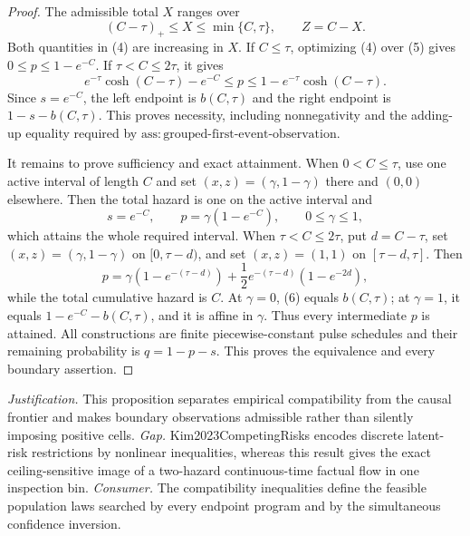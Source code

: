 \documentclass{article}
\begin{document}
\begin{proof}
The admissible total \(X\) ranges over
\[
 (C-\tau)_+\le X\le\min\{C,\tau\},\quad\quad Z=C-X.           \tag{5}
\]
Both quantities in (4) are increasing in \(X\).  If \(C\le\tau\), optimizing (4) over (5) gives \(0\le p\le1-e^{-C}\).  If \(\tau<C\le2\tau\), it gives
\[
 e^{-\tau}\cosh(C-\tau)-e^{-C}
 \le p\le
 1-e^{-\tau}\cosh(C-\tau).
\]
Since \(s=e^{-C}\), the left endpoint is \(b(C,\tau)\) and the right endpoint is \(1-s-b(C,\tau)\).  This proves necessity, including nonnegativity and the adding-up equality required by \(\mathrm{ass{:}grouped\text{-}first\text{-}event\text{-}observation}\).

It remains to prove sufficiency and exact attainment.  When \(0<C\le\tau\), use one active interval of length \(C\) and set \((x,z)=(\gamma,1-\gamma)\) there and \((0,0)\) elsewhere.  Then the total hazard is one on the active interval and
\[
 s=e^{-C},\quad\quad p=\gamma(1-e^{-C}),\quad\quad 0\le\gamma\le1,
\]
which attains the whole required interval.  When \(\tau<C\le2\tau\), put \(d=C-\tau\), set \((x,z)=(\gamma,1-\gamma)\) on \([0,\tau-d)\), and set \((x,z)=(1,1)\) on \([\tau-d,\tau]\).  Then
\[
 p=\gamma(1-e^{-(\tau-d)})
   +\frac12e^{-(\tau-d)}(1-e^{-2d}),                       \tag{6}
\]
while the total cumulative hazard is \(C\).  At \(\gamma=0\), (6) equals \(b(C,\tau)\); at \(\gamma=1\), it equals \(1-e^{-C}-b(C,\tau)\), and it is affine in \(\gamma\).  Thus every intermediate \(p\) is attained.  All constructions are finite piecewise-constant pulse schedules and their remaining probability is \(q=1-p-s\).  This proves the equivalence and every boundary assertion.
\end{proof}
\par\smallskip\noindent \textit{Justification.} This proposition separates empirical compatibility from the causal frontier and makes boundary observations admissible rather than silently imposing positive cells. \textit{Gap.} Kim2023CompetingRisks encodes discrete latent-risk restrictions by nonlinear inequalities, whereas this result gives the exact ceiling-sensitive image of a two-hazard continuous-time factual flow in one inspection bin. \textit{Consumer.} The compatibility inequalities define the feasible population laws searched by every endpoint program and by the simultaneous confidence inversion.
\end{document}
